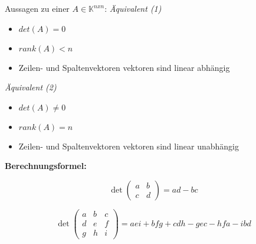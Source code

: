 \hspace{1cm}
\begin{minipage}{0.30\textwidth}
    Aussagen zu einer \(A\in \mathbb{K}^{nxn}\):
    \emph{Äquivalent (1)}
    \begin{itemize}
        \item \(det(A)=0\)
        \item \(rank(A)<n\)
        \item Zeilen- und Spaltenvektoren vektoren sind linear abhängig
    \end{itemize}
    \emph{Äquivalent (2)}
    \begin{itemize}
        \item \(det(A)\neq 0\)
        \item \(rank(A)=n\)
        \item Zeilen- und Spaltenvektoren vektoren sind linear unabhängig
    \end{itemize}
\end{minipage}

\vspace{1cm}
\textbf{Berechnungsformel:}
\begin{figure}[H]
    \begin{equation*}
        \det\begin{pmatrix}
        a & b \\
        c & d
        \end{pmatrix}
        = ad - bc
    \end{equation*}
\end{figure}

\begin{figure}[H]
    \begin{equation*}
        \det\begin{pmatrix}
        a & b & c \\
        d & e & f \\
        g & h & i
        \end{pmatrix}
        = aei + bfg + cdh - gec - hfa - ibd
    \end{equation*}
\end{figure}
